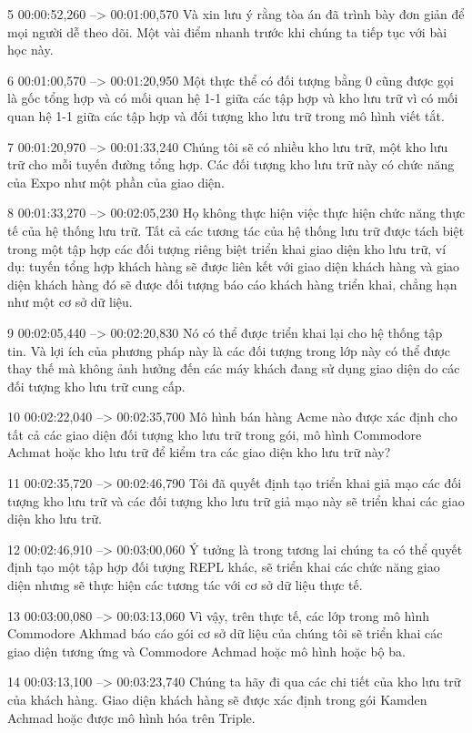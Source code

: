 5
00:00:52,260 --> 00:01:00,570
Và xin lưu ý rằng tòa án đã trình bày đơn giản để mọi người dễ theo dõi.  Một vài điểm nhanh trước khi chúng ta tiếp tục với bài học này.

6
00:01:00,570 --> 00:01:20,950
Một thực thể có đối tượng bằng 0 cũng được gọi là gốc tổng hợp và có mối quan hệ 1-1 giữa các tập hợp và kho lưu trữ vì có mối quan hệ 1-1 giữa các tập hợp và đối tượng kho lưu trữ trong mô hình viết tắt.

7
00:01:20,970 --> 00:01:33,240
Chúng tôi sẽ có nhiều kho lưu trữ, một kho lưu trữ cho mỗi tuyến đường tổng hợp.  Các đối tượng kho lưu trữ này có chức năng của Expo như một phần của giao diện.

8
00:01:33,270 --> 00:02:05,230
Họ không thực hiện việc thực hiện chức năng thực tế của hệ thống lưu trữ.  Tất cả các tương tác của hệ thống lưu trữ được tách biệt trong một tập hợp các đối tượng riêng biệt triển khai giao diện kho lưu trữ, ví dụ: tuyến tổng hợp khách hàng sẽ được liên kết với giao diện khách hàng và giao diện khách hàng đó sẽ được đối tượng báo cáo khách hàng triển khai, chẳng hạn như một  cơ sở dữ liệu.

9
00:02:05,440 --> 00:02:20,830
Nó có thể được triển khai lại cho hệ thống tập tin.  Và lợi ích của phương pháp này là các đối tượng trong lớp này có thể được thay thế mà không ảnh hưởng đến các máy khách đang sử dụng giao diện do các đối tượng kho lưu trữ cung cấp.

10
00:02:22,040 --> 00:02:35,700
Mô hình bán hàng Acme nào được xác định cho tất cả các giao diện đối tượng kho lưu trữ trong gói, mô hình Commodore Achmat hoặc kho lưu trữ để kiểm tra các giao diện kho lưu trữ này?

11
00:02:35,720 --> 00:02:46,790
Tôi đã quyết định tạo triển khai giả mạo các đối tượng kho lưu trữ và các đối tượng kho lưu trữ giả mạo này sẽ triển khai các giao diện kho lưu trữ.

12
00:02:46,910 --> 00:03:00,060
Ý tưởng là trong tương lai chúng ta có thể quyết định tạo một tập hợp đối tượng REPL khác, sẽ triển khai các chức năng giao diện nhưng sẽ thực hiện các tương tác với cơ sở dữ liệu thực tế.

13
00:03:00,080 --> 00:03:13,060
Vì vậy, trên thực tế, các lớp trong mô hình Commodore Akhmad báo cáo gói cơ sở dữ liệu của chúng tôi sẽ triển khai các giao diện tương ứng và Commodore Achmad hoặc mô hình hoặc bộ ba.

14
00:03:13,100 --> 00:03:23,740
Chúng ta hãy đi qua các chi tiết của kho lưu trữ của khách hàng.  Giao diện khách hàng sẽ được xác định trong gói Kamden Achmad hoặc được mô hình hóa trên Triple.

